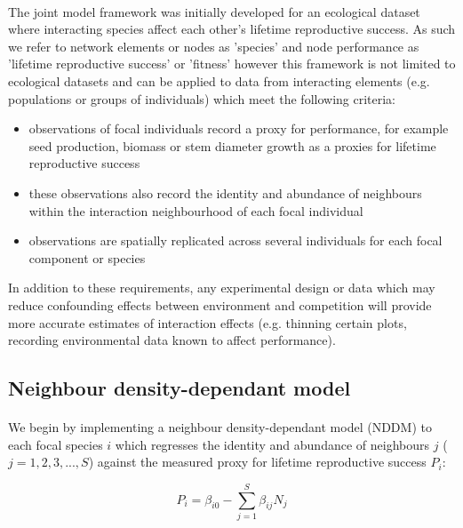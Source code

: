 \documentclass[a4,12pt]{article}
\begin{document}
    \paragraph{}
    The joint model framework was initially developed for an ecological dataset where interacting species affect each other's lifetime reproductive success. As such we refer to network elements or nodes as 'species' and node performance as 'lifetime reproductive success' or 'fitness' however this framework is not limited to ecological datasets and can be applied to data from interacting elements (e.g. populations or groups of individuals) which meet the following criteria: 
    \begin{itemize}
        \item observations of focal individuals record a proxy for performance, for example seed production, biomass or stem diameter growth as a proxies for lifetime reproductive success
        \item these observations also record the identity and abundance of neighbours within the interaction neighbourhood of each focal individual
        \item observations are spatially replicated across several individuals for each focal component or species
    \end{itemize}

    In addition to these requirements, any experimental design or data which may reduce confounding effects between environment and competition will provide more accurate estimates of interaction effects (e.g. thinning certain plots, recording environmental data known to affect performance). 
    
    \subsection{Neighbour density-dependant model}
        
        \paragraph{}
        We begin by implementing a neighbour density-dependant model (NDDM) to each focal species $i$ which regresses the identity and abundance of neighbours $j$ ($j = 1, 2, 3, ..., S$) against the measured proxy for lifetime reproductive success $P_{i}$:
        
        \begin{equation}
        P_{i} = \beta_{i0} - \sum_{j=1}^{S} \beta_{ij} N_{j}
        \label{nddm}
        \end{equation}
        
\end{document}
